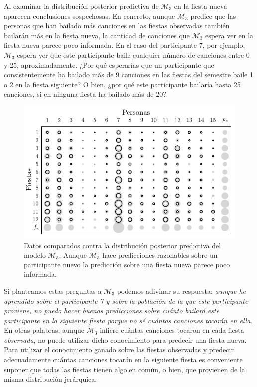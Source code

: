 \documentclass{article}
\begin{document}
\indent Al examinar la distribución posterior predictiva de $\mathcal M_3$ en la fiesta nueva aparecen conclusiones sospechosas. En concreto, aunque $\mathcal M_3$ predice que las personas que han bailado más canciones en las fiestas observadas también bailarán más en la fiesta nueva, la cantidad de canciones que $\mathcal M_3$ espera ver en la fiesta nueva parece poco informada. En el caso del participante 7, por ejemplo, $\mathcal M_3$ espera ver que este participante baile cualquier número de canciones entre 0 y 25, aproximadamente. ¿Por qué esperarías que un participante que consistentemente ha bailado más de 9 canciones en las fiestas del semestre baile 1 o 2 en la fiesta siguiente? O bien, ¿por qué este participante bailaría hasta 25 canciones, si en ninguna fiesta ha bailado más de 20?\\

\begin{figure}[H]
\centering
\setlength\fboxsep{0pt}
\setlength\fboxrule{0.5pt}
\includegraphics[trim=0cm 0cm 0cm 0cm, clip=true, width=1\textwidth]	{data_pos_pred_m3.pdf}
\caption{Datos comparados contra la distribución posterior predictiva del modelo $\mathcal M_3$. Aunque $\mathcal M_3$ hace predicciones razonables sobre un participante nuevo la predicción sobre una fiesta nueva parece poco informada.}
\label{fig:data_3}
\end{figure}
	
\indent Si planteamos estas preguntas a $\mathcal M_3$ podemos adivinar su respuesta: \emph{aunque he aprendido sobre el participante 7 y sobre la población de la que este participante proviene, no puedo hacer buenas predicciones sobre cuánto bailará este participante en la siguiente fiesta porque no sé cuántas canciones tocarán en ella}. En otras palabras, aunque $\mathcal M_3$ infiere cuántas canciones tocaron en cada fiesta \emph{observada}, no puede utilizar dicho conocimiento para predecir una fiesta nueva. Para utilizar el conocimiento ganado sobre las fiestas observadas y predecir adecuadamente cuántas canciones tocarán en la siguiente fiesta es conveniente suponer que todas las fiestas tienen algo en común, o bien, que provienen de la misma distribución jerárquica.\\
	
\end{document}
